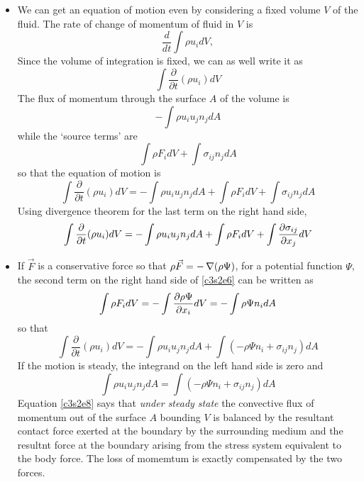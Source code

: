 \begin{itemize}
\item We can get an equation of motion even by considering a fixed volume $V$ of the fluid. The rate of change of momentum of fluid in $V$ is
\[
\frac{d}{dt}\int\rho u_i dV,
\]
Since the volume of integration is fixed, we can as well write it as
\[
\int\frac{\partial}{\partial t}(\rho u_i)dV
\]
The flux of momentum through the surface $A$ of the volume is
\[
-\int\rho u_i u_j n_j dA
\]
while the \enquote*{source terms} are
\[
\int\rho F_i dV + \int\sigma_{ij}n_j dA
\]
so that the equation of motion is
\begin{equation}\label{c3s2e6}
\int\frac{\partial}{\partial t}(\rho u_i)dV = -\int\rho u_i u_j n_j dA + \int\rho F_i dV + \int\sigma_{ij}n_j dA
\end{equation}
Using divergence theorem for the last term on the right hand side,
\begin{equation}\label{c3s2e7}
\int\frac{\partial}{\partial t}(\rho u_i)dV = -\int\rho u_i u_j n_j dA + \int\rho F_i dV + \int\frac{\partial{\sigma_{ij}}}{\partial{x_j}} dV
\end{equation}

\item If $\vec{F}$ is a conservative force so that $\rho\vec{F} = -\operatorname{\nabla}(\rho\Psi)$, for a potential function $\Psi$, the second term on the right hand side of \eqref{c3s2e6} can be
written as
\[
\int\rho F_i dV = -\int\frac{\partial{\rho\Psi}}{\partial{x_i}}dV = -\int\rho\Psi n_i dA
\]
so that 
\[
\int\frac{\partial}{\partial t}(\rho u_i)dV = -\int\rho u_i u_j n_j dA + \int\left(-\rho\Psi n_i + \sigma_{ij}n_j\right) dA
\]
If the motion is steady, the integrand on the left hand side is zero and
\begin{equation}\label{c3s2e8}
\int\rho u_i u_j n_j dA = \int\left(-\rho\Psi n_i + \sigma_{ij}n_j\right) dA
\end{equation}
Equation \eqref{c3s2e8} says that \emph{under steady state} the convective flux of momentum out of the surface $A$ bounding $V$ is balanced by the resultant contact force exerted at
the boundary by the surrounding medium and the resultnt force at the boundary arising from the stress system equivalent to the body force. The loss of momemtum is exactly compensated by
the two forces.
\end{itemize}

